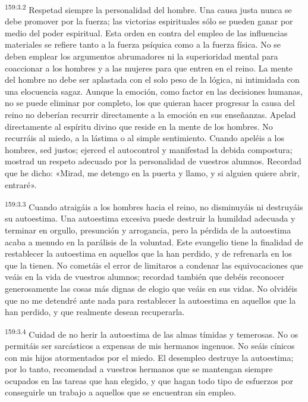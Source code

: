 \par 
\textsuperscript{159:3.2} Respetad siempre la personalidad del hombre. Una causa justa nunca se debe promover por la fuerza; las victorias espirituales sólo se pueden ganar por medio del poder espiritual. Esta orden en contra del empleo de las influencias materiales se refiere tanto a la fuerza psíquica como a la fuerza física. No se deben emplear los argumentos abrumadores ni la superioridad mental para coaccionar a los hombres y a las mujeres para que entren en el reino. La mente del hombre no debe ser aplastada con el solo peso de la lógica, ni intimidada con una elocuencia sagaz. Aunque la emoción, como factor en las decisiones humanas, no se puede eliminar por completo, los que quieran hacer progresar la causa del reino no deberían recurrir directamente a la emoción en sus enseñanzas. Apelad directamente al espíritu divino que reside en la mente de los hombres. No recurráis al miedo, a la lástima o al simple sentimiento. Cuando apeléis a los hombres, sed justos; ejerced el autocontrol y manifestad la debida compostura; mostrad un respeto adecuado por la personalidad de vuestros alumnos. Recordad que he dicho: «Mirad, me detengo en la puerta y llamo, y si alguien quiere abrir, entraré».

\par 
\textsuperscript{159:3.3} Cuando atraigáis a los hombres hacia el reino, no disminuyáis ni destruyáis su autoestima. Una autoestima excesiva puede destruir la humildad adecuada y terminar en orgullo, presunción y arrogancia, pero la pérdida de la autoestima acaba a menudo en la parálisis de la voluntad. Este evangelio tiene la finalidad de restablecer la autoestima en aquellos que la han perdido, y de refrenarla en los que la tienen. No cometáis el error de limitaros a condenar las equivocaciones que veáis en la vida de vuestros alumnos; recordad también que debéis reconocer generosamente las cosas más dignas de elogio que veáis en sus vidas. No olvidéis que no me detendré ante nada para restablecer la autoestima en aquellos que la han perdido, y que realmente desean recuperarla.

\par 
\textsuperscript{159:3.4} Cuidad de no herir la autoestima de las almas tímidas y temerosas. No os permitáis ser sarcásticos a expensas de mis hermanos ingenuos. No seáis cínicos con mis hijos atormentados por el miedo. El desempleo destruye la autoestima; por lo tanto, recomendad a vuestros hermanos que se mantengan siempre ocupados en las tareas que han elegido, y que hagan todo tipo de esfuerzos por conseguirle un trabajo a aquellos que se encuentran sin empleo.

